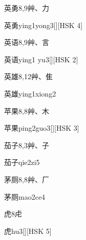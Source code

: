 \begin{entry}{英勇}{8,9}{⾋、⼒}
  \begin{phonetics}{英勇}{ying1yong3}[][HSK 4]
  \end{phonetics}
\end{entry}

\begin{entry}{英语}{8,9}{⾋、⾔}
  \begin{phonetics}{英语}{ying1 yu3}[][HSK 2]
  \end{phonetics}
\end{entry}

\begin{entry}{英雄}{8,12}{⾋、⾫}
  \begin{phonetics}{英雄}{ying1xiong2}
  \end{phonetics}
\end{entry}

\begin{entry}{苹果}{8,8}{⾋、⽊}
  \begin{phonetics}{苹果}{ping2guo3}[][HSK 3]
  \end{phonetics}
\end{entry}

\begin{entry}{茄子}{8,3}{⾋、⼦}
  \begin{phonetics}{茄子}{qie2zi5}
  \end{phonetics}
\end{entry}

\begin{entry}{茅厕}{8,8}{⾋、⼚}
  \begin{phonetics}{茅厕}{mao2ce4}
  \end{phonetics}
\end{entry}

\begin{entry}{虎}{8}{⾌}
  \begin{phonetics}{虎}{hu3}[][HSK 5]
  \end{phonetics}
\end{entry}

